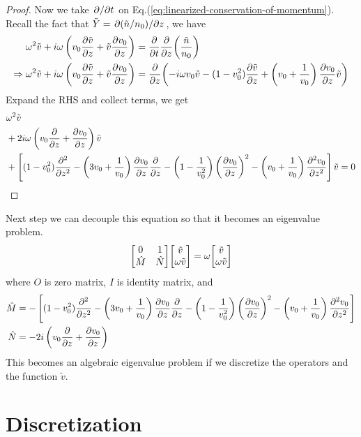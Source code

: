 \begin{proof}
	Now we take $\pdv*{t}$ on Eq.(\ref{eq:linearized-conservation-of-momentum}). Recall the fact that $\tilde{Y} = \pdv*{(\tilde{n}/n_0)}{z}$, we have
	\begin{align*}
		\omega^2\tilde{v} + i\omega\left(v_0\pdv{\tilde{v}}{z} + \tilde{v}\pdv{v_0}{z}\right) &= \pdv{t}\pdv{z}(\frac{\tilde{n}}{n_0}) \\
		\Rightarrow
		\omega^2\tilde{v} + i\omega\left(v_0\pdv{\tilde{v}}{z} + \tilde{v}\pdv{v_0}{z}\right) &= \pdv{z}(-i\omega v_0\tilde{v}
		- (1-v_0^2)\pdv{\tilde{v}}{z} 
		+ \left(v_0+\frac{1}{v_0}\right)\pdv{v_0}{z}\tilde{v})
	\end{align*}
	Expand the RHS and collect terms, we get
	\begin{align*}
		&\omega^2 \tilde{v} \\ 
		&+2i\omega\left(v_0\pdv{}{z} + \pdv{v_0}{z}\right) \tilde{v} \\ 
		&+\left[ (1-v_0^2)\pdv[2]{}{z} 
		-\left(3v_0 + \frac{1}{v_0}\right)\pdv{v_0}{z}\pdv{}{z} 
		- \left(1-\frac{1}{v_0^2}\right)\left(\pdv{v_0}{z}\right)^2 
		- \left(v_0+\frac{1}{v_0}\right)\pdv[2]{v_0}{z} \right]\tilde{v}
		= 0
	\end{align*}
\end{proof}

Next step we can decouple this equation so that it becomes an eigenvalue problem.
\begin{equation}
	\mqty[ 0 & 1\\ \hat{M} & \hat{N} ]\mqty[ \tilde{v}\\ \omega \tilde{v}] = \omega\mqty[ \tilde{v}\\ \omega \tilde{v}]
	\label{eq:eigenvalue-problem}
\end{equation}
where $O$ is zero matrix, $I$ is identity matrix, and
\begin{align*}
	\hat{M} &= -\left[(1-v_0^2)\pdv[2]{}{z} 
	-\left(3v_0 + \frac{1}{v_0}\right)\pdv{v_0}{z}\pdv{}{z} 
	- \left(1-\frac{1}{v_0^2}\right)\left(\pdv{v_0}{z}\right)^2 
	- \left(v_0+\frac{1}{v_0}\right)\pdv[2]{v_0}{z}\right] \\
	\hat{N} &= -2i\left(v_0\pdv{}{z} +\pdv{v_0}{z} \right) 
\end{align*}
This becomes an algebraic eigenvalue problem if we discretize the operators and the function $\tilde{v}$.




\section{Discretization}


